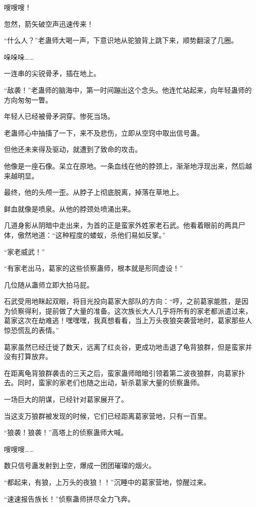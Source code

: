 \begin{this_body}
嗖嗖嗖！

忽然，箭矢破空声迅速传来！

“什么人？”老蛊师大喝一声，下意识地从驼狼背上跳下来，顺势翻滚了几圈。

哚哚哚……

一连串的尖锐骨矛，插在地上。

“敌袭！”老蛊师的脑海中，第一时间蹦出这个念头。他连忙站起来，向年轻蛊师的方向匆匆一瞥。

年轻人已经被骨矛洞穿。惨死当场。

老蛊师心中抽搐了一下，来不及悲伤，立即从空窍中取出信号蛊。

但他还未来得及驱动，就遭到了致命的攻击。

他像是一座石像。呆立在原地。一条血线在他的脖颈上，渐渐地浮现出来，然后越来越明显。

最终，他的头颅一歪。从脖子上彻底脱离，掉落在草地上。

鲜血就像是喷泉。从他的脖颈处喷涌出来。

几道身影从阴暗中走出来，为首的正是蛮家外姓家老石武。他看着眼前的两具尸体，傲然地道：“这种程度的蝼蚁，杀他们易如反掌。”

“家老威武！”

“有家老出马，葛家的这些侦察蛊师，根本就是形同虚设！”

几位随从蛊师立即大拍马屁。

石武受用地眯起双眼，将目光投向葛家大部队的方向：“哼，之前葛家能胜，是因为侦察得利，提前做了大量的准备。这次族长大人几乎将所有的家老都派遣过来，葛家这次在劫难逃！嘿嘿嘿，我真想看看，当上万头夜狼突袭营地时，葛家那些人惊恐慌乱的表情。”

葛家虽然已经迁徙了数天，远离了红炎谷，更成功地击退了龟背狼群，但是蛮家并没有打算放弃。

在距离龟背狼群袭击的三天之后，蛮家蛊师暗暗引领着第二波夜狼群，向葛家扑去。同时，蛮家的家老们也随之出动，斩杀葛家大量的侦察蛊师。

一场巨大的阴谋，已经针对葛家展开了。

当这支万狼群被发现的时候，它们已经距离葛家营地，只有一百里。

“狼袭！狼袭！”高塔上的侦察蛊师大喊。

嗖嗖嗖……

数只信号蛊发射到上空，爆成一团团璀璨的烟火。

“都起来，有狼，上万头的夜狼！！”沉睡中的葛家营地，惊醒过来。

“速速报告族长！”侦察蛊师拼尽全力飞奔。


\end{this_body}

